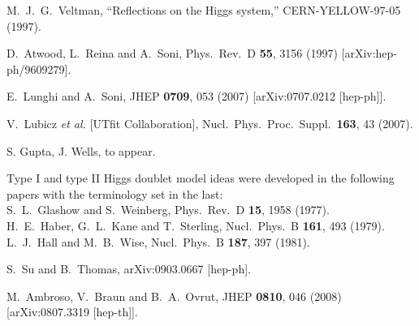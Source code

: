 \documentclass[12pt]{article}
\begin{document}
\begin{thebibliography}{9}
 
  M.~J.~G.~Veltman,
  ``Reflections on the Higgs system,'' 
  CERN-YELLOW-97-05 (1997).
  
  D.~Atwood, L.~Reina and A.~Soni,
  Phys.\ Rev.\  D {\bf 55}, 3156 (1997)
  [arXiv:hep-ph/9609279].
  

  E.~Lunghi and A.~Soni,
  JHEP {\bf 0709}, 053 (2007)
  [arXiv:0707.0212 [hep-ph]].
  
  V.~Lubicz {\it et al.}  [UTfit Collaboration],
  Nucl.\ Phys.\ Proc.\ Suppl.\  {\bf 163}, 43 (2007).

  S. Gupta, J. Wells, to appear.

   
  Type I and type II Higgs doublet model ideas were developed in the following  papers with the terminology set in the last: \\
  S.~L.~Glashow and S.~Weinberg,
  Phys.\ Rev.\  D {\bf 15}, 1958 (1977). \\
  H.~E.~Haber, G.~L.~Kane and T.~Sterling,
  Nucl.\ Phys.\  B {\bf 161}, 493 (1979).\\
  L.~J.~Hall and M.~B.~Wise,
  Nucl.\ Phys.\  B {\bf 187}, 397 (1981).



  S.~Su and B.~Thomas,
  arXiv:0903.0667 [hep-ph].


  M.~Ambroso, V.~Braun and B.~A.~Ovrut,
  JHEP {\bf 0810}, 046 (2008)
  [arXiv:0807.3319 [hep-th]].


\end{thebibliography}
\end{document}
